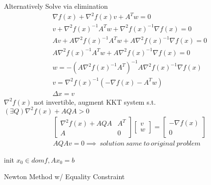 \documentclass[8pt]{report}
\begin{document}
\begin{multicols*}{2}
  Alternatively Solve via elimination
  \begin{align*}
    &\nabla f(x) + \nabla^2 f(x) v + A^T w = 0\\
    &v + \nabla^2 f(x)^{-1} A^T w + \nabla^2 f(x)^{-1} \nabla f(x)=0\\
    &Av + A \nabla^2 f(x)^{-1} A^T w + A \nabla^2 f(x)^{-1} \nabla f(x)=0\\
    &A \nabla^2 f(x)^{-1} A^T w + A \nabla^2 f(x)^{-1} \nabla f(x)=0\\
    &w = - (A \nabla^2 f(x)^{-1} A^T)^{-1} A \nabla^2 f(x)^{-1} \nabla f(x)\\
    &v = \nabla^2 f(x)^{-1} (-\nabla f(x) - A^T w)\\
    &\Delta x = v
  \end{align*}
  $\nabla^2 f(x)$ not invertible, augment KKT system s.t.\\
  $(\exists Q) \nabla^2 f(x) + AQA > 0$\\  
  \begin{align*}
    &\begin{bmatrix}
      \nabla^2 f(x) + AQA & A^T \\
      A & 0 
    \end{bmatrix}
    \begin{bmatrix}
      v\\ w
    \end{bmatrix} =
    \begin{bmatrix}
      -\nabla f(x)\\
      0
    \end{bmatrix}\\
    &AQAv = 0 \implies\ solution\ same\ to\ original\ problem
  \end{align*}
  
  \vfill\null
  \columnbreak
  
  \begin{algorithm}[H]
    init $x_0 \in dom f, Ax_0=b$\;
    \caption{Newton Method w/ Equality Constraint\label{NewtonMethodEq}}
  \end{algorithm}


\end{multicols*}
\end{document}

